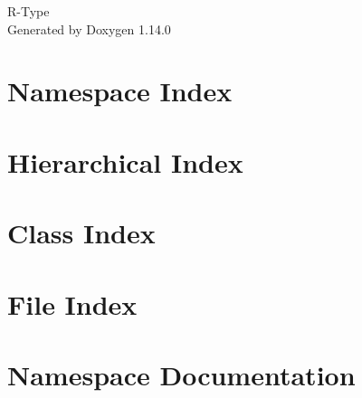 \documentclass[twoside]{book}
\newcommand{\+}{\discretionary{\mbox{\scriptsize$\hookleftarrow$}}{}{}}
\newcommand{\clearemptydoublepage}{%
    \newpage{\pagestyle{empty}\cleardoublepage}%
  }
\begin{document}
  \raggedbottom
    \hypersetup{pageanchor=false,
                bookmarksnumbered=true,
                pdfencoding=unicode
               }
  \begin{titlepage}
  \vspace*{7cm}
  \begin{center}%
  {\Large R-\/\+Type}\\
  \vspace*{1cm}
  {\large Generated by Doxygen 1.14.0}\\
  \end{center}
  \end{titlepage}
  \clearemptydoublepage
  \tableofcontents
  \clearemptydoublepage
  \hypersetup{pageanchor=true}












\chapter{Namespace Index}

\chapter{Hierarchical Index}

\chapter{Class Index}

\chapter{File Index}

\chapter{Namespace Documentation}












\end{document}

